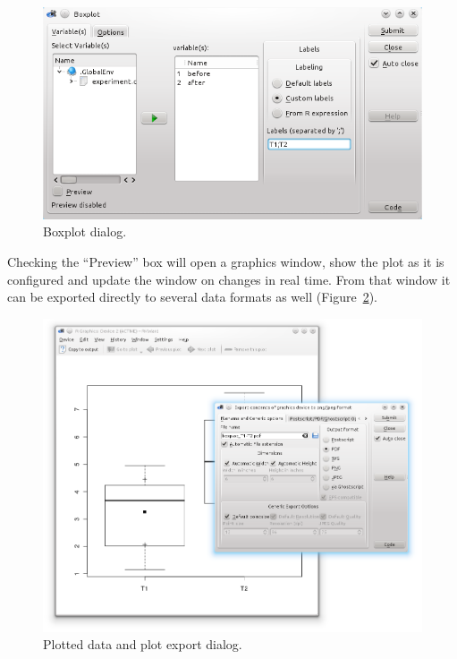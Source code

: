 \begin{figure}[htp]
 \centering
 \includegraphics[width=15.5cm]{../figures/boxplot1.png}
 \caption{Boxplot dialog.}
 \label{fig:boxplot1}
\end{figure}

Checking the ``Preview'' box will open a graphics window, show the plot as
it is configured and update the window on changes in real time. From
that window it can be exported directly to several data formats as
well (Figure~\ref{fig:boxplot2}).

\begin{figure}[htp]
 \centering
 \includegraphics[width=15.5cm]{../figures/boxplot2.png}
 \caption{Plotted data and plot export dialog.}
 \label{fig:boxplot2}
\end{figure}
